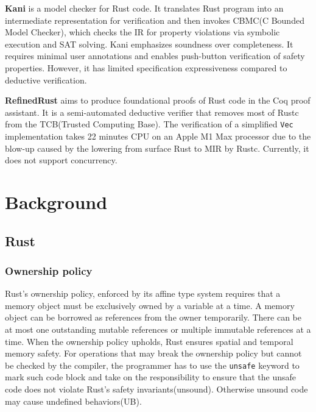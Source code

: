 \documentclass[conference]{IEEEtran}
\begin{document}
\textbf{Kani}\cite{kani} is a model checker for Rust code. It translates Rust program into an intermediate representation for verification and then invokes CBMC(C Bounded Model Checker)\cite{kroening2023cbmccboundedmodel}, which checks the IR for property violations via symbolic execution and SAT solving. Kani emphasizes soundness over completeness. It requires minimal user annotations and enables push-button verification of safety properties. However, it has limited specification expressiveness compared to deductive verification.   

\textbf{RefinedRust}\cite{RefinedRust} aims to produce foundational proofs of Rust code in the Coq proof assistant. It is a semi-automated deductive verifier that removes most of Rustc from the TCB(Trusted Computing Base). The verification of a simplified \texttt{Vec} implementation takes 22 minutes CPU on an Apple M1 Max processor due to the blow-up caused by the lowering from surface Rust to MIR by Rustc. Currently, it does not support concurrency.       




\section{Background}

\subsection{Rust}
\subsubsection{Ownership policy}
Rust's ownership policy, enforced by its affine type system requires that a memory object must be exclusively owned by a variable at a time. A memory object can be borrowed as references from the owner temporarily. There can be at most one outstanding mutable references or multiple immutable references at a time. When the ownership policy upholds, Rust ensures spatial and temporal memory safety. For operations that may break the ownership policy but cannot be checked by the compiler, the programmer has to use the \texttt{unsafe} keyword to mark such code block and take on the responsibility to ensure that the unsafe code does not violate Rust's safety invariants(unsound). Otherwise unsound code may cause undefined behaviors(UB).
\end{document}
